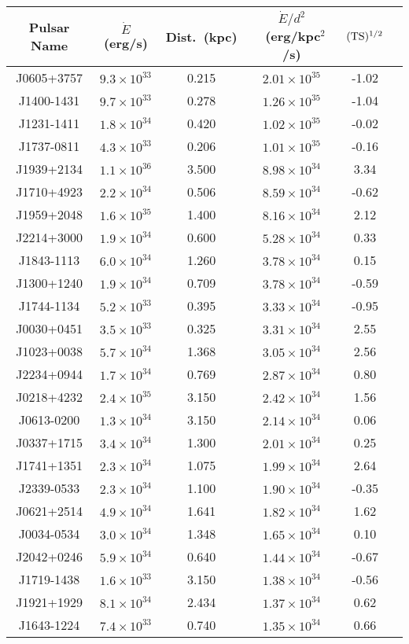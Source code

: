 \documentclass[aps,prd,twocolumn,amsmath,superscriptaddress,amssymb,showpacs,floatfix,nofootinbib,longbibliography,preprintnumbers]{revtex4-1}
\begin{document}
\begin{table}[t]
\begin{tabular}{|c|c|c|c|c|c|}
\hline 
Pulsar Name   & $\dot{E}$ (erg/s) & Dist.~(kpc) & $\dot{E}/d^2$~(erg/kpc$^2$/s) & $({\rm TS})^{1/2}$  
\tabularnewline
\hline
J0605+3757 & $9.3\times 10^{33}$ & 0.215 & $2.01 \times 10^{35}$ & -1.02 
\tabularnewline
\hline
J1400-1431 & $9.7\times 10^{33}$ & 0.278 & $1.26 \times 10^{35}$ & -1.04 
\tabularnewline
\hline
J1231-1411 & $1.8\times 10^{34}$ & 0.420 & $1.02 \times 10^{35}$ & -0.02 
\tabularnewline
\hline
J1737-0811 & $4.3\times 10^{33}$ & 0.206 & $1.01 \times 10^{35}$ & -0.16 
\tabularnewline
\hline
J1939+2134 & $1.1\times 10^{36}$ & 3.500 & $8.98 \times 10^{34}$ & 3.34 
\tabularnewline
\hline
J1710+4923 & $2.2\times 10^{34}$ & 0.506 & $8.59 \times 10^{34}$ & -0.62 
\tabularnewline
\hline
J1959+2048 & $1.6\times 10^{35}$ & 1.400 & $8.16 \times 10^{34}$ & 2.12 
\tabularnewline
\hline
J2214+3000 & $1.9\times 10^{34}$ & 0.600 & $5.28 \times 10^{34}$ & 0.33 
\tabularnewline
\hline
J1843-1113 & $6.0\times 10^{34}$ & 1.260 & $3.78 \times 10^{34}$ & 0.15 
\tabularnewline
\hline
J1300+1240 & $1.9\times 10^{34}$ & 0.709 & $3.78 \times 10^{34}$ & -0.59
\tabularnewline
\hline
J1744-1134 & $5.2\times 10^{33}$ & 0.395 & $3.33 \times 10^{34}$ & -0.95 
\tabularnewline
\hline
J0030+0451 & $3.5\times 10^{33}$ & 0.325 & $3.31 \times 10^{34}$ & 2.55 
\tabularnewline
\hline
J1023+0038 & $5.7\times 10^{34}$ & 1.368 & $3.05 \times 10^{34}$ & 2.56 
\tabularnewline
\hline
J2234+0944 & $1.7\times 10^{34}$ & 0.769 & $2.87 \times 10^{34}$ & 0.80 
\tabularnewline
\hline
J0218+4232 & $2.4\times 10^{35}$ & 3.150 & $2.42 \times 10^{34}$ & 1.56 
\tabularnewline
\hline
J0613-0200 & $1.3\times 10^{34}$ & 3.150 & $2.14 \times 10^{34}$ & 0.06 
\tabularnewline
\hline
J0337+1715 & $3.4\times 10^{34}$ & 1.300 & $2.01 \times 10^{34}$ & 0.25 
\tabularnewline
\hline
J1741+1351 & $2.3\times 10^{34}$ & 1.075 & $1.99 \times 10^{34}$ & 2.64 
\tabularnewline
\hline
J2339-0533 & $2.3\times 10^{34}$ & 1.100 & $1.90 \times 10^{34}$ & -0.35 
\tabularnewline
\hline
J0621+2514 & $4.9\times 10^{34}$ & 1.641 & $1.82 \times 10^{34}$ & 1.62
\tabularnewline
\hline
J0034-0534 & $3.0\times 10^{34}$ & 1.348 & $1.65 \times 10^{34}$ & 0.10 
\tabularnewline
\hline
J2042+0246 & $5.9\times 10^{34}$ & 0.640 & $1.44 \times 10^{34}$ & -0.67 
\tabularnewline
\hline
J1719-1438 & $1.6\times 10^{33}$ & 3.150 & $1.38 \times 10^{34}$ & -0.56 
\tabularnewline
\hline
J1921+1929 & $8.1\times 10^{34}$ & 2.434 & $1.37 \times 10^{34}$ & 0.62 
\tabularnewline
\hline
J1643-1224 & $7.4\times 10^{33}$ & 0.740 & $1.35 \times 10^{34}$ & 0.66 

\end{tabular}
\end{table}
\end{document}
